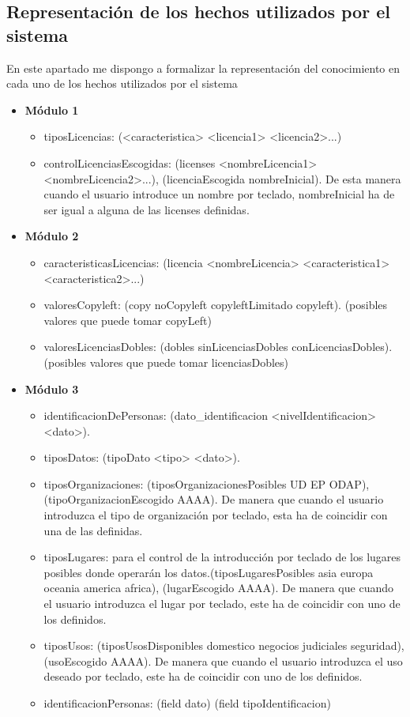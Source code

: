 \subsection{Representación de los hechos utilizados por el sistema}
En este apartado me dispongo a formalizar la representación del conocimiento en cada uno de los hechos utilizados por el sistema
\begin{itemize}
	\item \textbf{Módulo 1}
	\begin{itemize}
		\item tiposLicencias: (<caracteristica> <licencia1> <licencia2>...)
		\item controlLicenciasEscogidas: (licenses <nombreLicencia1> <nombreLicencia2>...), (licenciaEscogida nombreInicial). De esta manera cuando el usuario introduce un nombre por teclado, nombreInicial ha de ser igual a alguna de las licenses definidas.
	\end{itemize}
	\item \textbf{Módulo 2}
	\begin{itemize}
		\item caracteristicasLicencias: (licencia <nombreLicencia> <caracteristica1> <caracteristica2>...)
		\item valoresCopyleft: (copy noCopyleft copyleftLimitado copyleft). (posibles valores que puede tomar copyLeft)
		\item valoresLicenciasDobles: (dobles sinLicenciasDobles conLicenciasDobles). (posibles valores que puede tomar licenciasDobles)
	\end{itemize}
	\item \textbf{Módulo 3}
	\begin{itemize}
		\item identificacionDePersonas: (dato\_identificacion <nivelIdentificacion> <dato>).
		\item tiposDatos: (tipoDato <tipo> <dato>).
		\item tiposOrganizaciones: (tiposOrganizacionesPosibles UD EP ODAP), (tipoOrganizacionEscogido AAAA). De manera que cuando el usuario introduzca el tipo de organización por teclado, esta ha de coincidir con una de las definidas.
		\item tiposLugares:  para el control de la introducción por teclado de los lugares posibles donde operarán los datos.(tiposLugaresPosibles asia europa oceania america africa), (lugarEscogido AAAA).
		De manera que cuando el usuario introduzca el lugar por teclado, este ha de coincidir con uno de los definidos.
		\item tiposUsos:  (tiposUsosDisponibles domestico negocios judiciales seguridad), (usoEscogido AAAA).
		De manera que cuando el usuario introduzca el uso deseado por teclado, este ha de coincidir con uno de los definidos. 
		\item identificacionPersonas: (field dato) (field tipoIdentificacion)
	\end{itemize}
\end{itemize}

